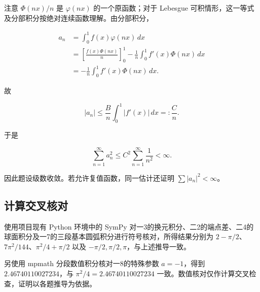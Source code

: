 \documentclass[11pt,fontset=fandol]{ctexart}
\begin{document}
注意 \(\Phi(nx)/n\) 是 \(\varphi(nx)\) 的一个原函数；对于 Lebesgue
可积情形，这一等式及分部积分按绝对连续函数理解。由分部积分，

\[
\begin{aligned}
a_n&=\int_0^1 f(x)\varphi(nx)\,dx\\
&=\left[\frac{f(x)\Phi(nx)}n\right]_0^1
-\frac1n\int_0^1f'(x)\Phi(nx)\,dx\\
&=-\frac1n\int_0^1f'(x)\Phi(nx)\,dx.
\end{aligned}
\]

故

\[
|a_n|\le\frac Bn\int_0^1|f'(x)|\,dx=:\frac Cn.
\]

于是

\[
\sum_{n=1}^\infty a_n^2
\le C^2\sum_{n=1}^\infty\frac1{n^2}<\infty.
\]

因此题设级数收敛。若允许复值函数，同一估计还证明
\(\sum|a_n|^2<\infty\)。

\subsection{计算交叉核对}\label{ux8ba1ux7b97ux4ea4ux53c9ux6838ux5bf9}

使用项目现有 Python 环境中的 SymPy
对一3的换元积分、二2的端点差、二4的球面积分及一7的三段基本圆弧积分进行符号核对，所得结果分别为
\(2-\pi/2\)、\(7\pi^2/144\)、\(\pi^2/4+\pi/2\) 以及
\(-\pi/2,\pi/2,\pi\)，与上述推导一致。

另使用 mpmath 分段数值积分核对一8的特殊参数 \(a=-1\)，得到
\(2.46740110027234\)，与 \(\pi^2/4=2.46740110027234\)
一致。数值核对仅作计算交叉检查，证明以各题推导为依据。
\end{document}
